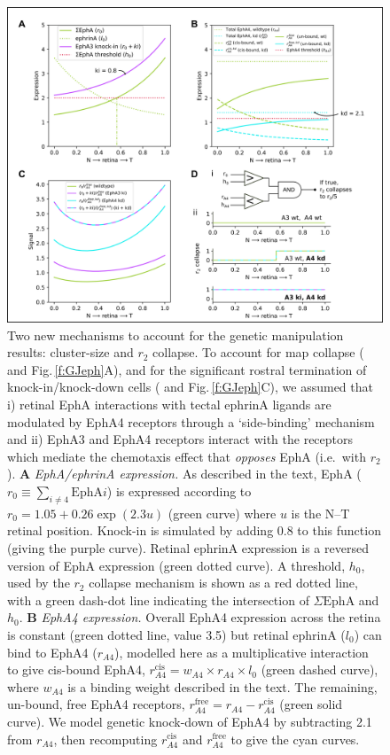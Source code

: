 \documentclass[9pt,lineno,draft]{elife}
\begin{document}
\begin{figure}
\includegraphics[width=\linewidth]{./images/EphA_manipulations_explanation.png}
\caption{Two new mechanisms to account for the genetic manipulation results: cluster-size and $r_2$ collapse. To account for map collapse (\citet{brown_topographic_2000} and Fig.\,\ref{f:GJeph}A), and for the significant rostral termination of knock-in/knock-down cells (\citet{reber_relative_2004} and Fig.\,\ref{f:GJeph}C), we assumed that i) retinal EphA interactions with tectal ephrinA ligands are modulated by EphA4 receptors through a `side-binding' mechanism and ii) EphA3 and EphA4 receptors interact with the receptors which mediate the chemotaxis effect that \emph{opposes} EphA (i.e.~with $r_2$).
\textbf{A} \emph{EphA/ephrinA expression.} As described in the text, EphA ($r_0 \equiv \sum_{i\neq 4}\mathrm{EphA}i$) is expressed according to $r_0 = 1.05 + 0.26 \exp(2.3 u)$ (green curve) where $u$ is the N--T retinal position. Knock-in is simulated by adding 0.8 to this function (giving the purple curve). Retinal ephrinA expression is a reversed version of EphA expression (green dotted curve). A threshold, $h_0$, used by the $r_2$ collapse mechanism is shown as a red dotted line, with a green dash-dot line indicating the intersection of $\Sigma\mathrm{EphA}$ and $h_0$.
\textbf{B} \emph{EphA4 expression.} Overall EphA4 expression across the retina is constant (green dotted line, value 3.5) but retinal ephrinA ($l_0$) can bind to EphA4 ($r_{A4}$), modelled here as a multiplicative interaction to give cis-bound EphA4, $r_{A4}^{\mathrm{cis}} = w_{A4} \times r_{A4} \times l_0$ (green dashed curve), where $w_{A4}$ is a binding weight described in the text. The remaining, un-bound, free EphA4 receptors, $r_{A4}^{\mathrm{free}} = r_{A4} - r_{A4}^{\mathrm{cis}}$ (green solid curve). We model genetic knock-down of EphA4 by subtracting 2.1 from $r_{A4}$, then recomputing $r_{A4}^{\mathrm{cis}}$ and $r_{A4}^{\mathrm{free}}$ to give the cyan curves.
}
\end{figure}
\end{document}
